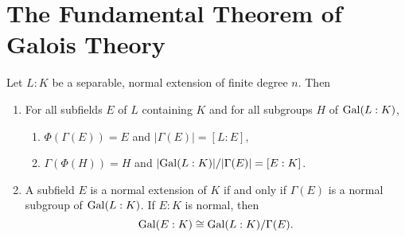 \section{The Fundamental Theorem of Galois Theory}
\begin{theorem}
  Let $L : K$ be a separable, normal extension of
  finite degree $n$. Then
  \begin{enumerate}
    \item For all subfields $E$ of $L$ containing
      $K$ and for all subgroups $H$ of $\operatorname{Gal}(L : K)$,
      \begin{enumerate}
        \item $\Phi(\Gamma(E)) = E$ and
          $|\Gamma(E)| = [L : E]$,
        \item $\Gamma(\Phi(H)) = H$ and
          $|{\operatorname{Gal}(L : K)}| / |\Gamma(E)| = [E : K]$.
      \end{enumerate}
    \item A subfield $E$ is a normal extension of $K$
      if and only if $\Gamma(E)$ is a normal subgroup
      of $\operatorname{Gal}(L : K)$. If $E : K$ is normal, then
      \[
        \operatorname{Gal}(E : K) \cong \operatorname{Gal}(L : K) / \Gamma(E).
      \]
  \end{enumerate}
\end{theorem}

